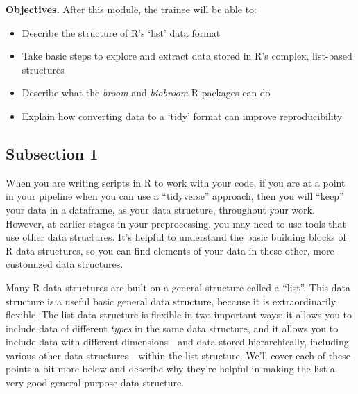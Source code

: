 \documentclass[]{tufte-book}
\providecommand{\tightlist}{%
  \setlength{\itemsep}{0pt}\setlength{\parskip}{0pt}}
\begin{document}
\textbf{Objectives.} After this module, the trainee will be able to:

\begin{itemize}
\tightlist
\item
  Describe the structure of R's `list' data format
\item
  Take basic steps to explore and extract data stored in R's complex, list-based
  structures
\item
  Describe what the \emph{broom} and \emph{biobroom} R packages can do
\item
  Explain how converting data to a `tidy' format can improve reproducibility
\end{itemize}

\hypertarget{subsection-1-7}{%
\subsection{Subsection 1}\label{subsection-1-7}}

When you are writing scripts in R to work with your code, if you are at a
point in your pipeline when you can use a ``tidyverse'' approach, then you will
``keep'' your data in a dataframe, as your data structure, throughout your
work. However, at earlier stages in your preprocessing, you may need to use
tools that use other data structures. It's helpful to understand the
basic building blocks of R data structures, so you can find elements of your
data in these other, more customized data structures.

Many R data structures are built on a general structure called a ``list''. This
data structure is a useful basic general data structure, because it is
extraordinarily flexible. The list data structure is flexible in two
important ways: it allows you to include data of different \emph{types} in the
same data structure, and it allows you to include data with different
dimensions---and data stored hierarchically, including various other data
structures---within the list structure. We'll cover each of these points a bit
more below and describe why they're helpful in making the list a very good
general purpose data structure.
\end{document}
